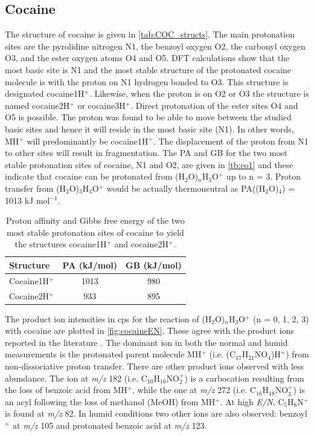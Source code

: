  
\subsection{Cocaine}
The structure of cocaine is given in \autoref{tab:COC_structs}. The main protonation sites are the pyrolidine nitrogen N1, the benzoyl oxygen O2, the carbonyl oxygen O3, and the ester oxygen atoms O4 and O5.
%
DFT calculations show that the most basic site is N1 and the most stable structure of the protonated cocaine molecule is with the proton on N1 hydrogen bonded to O3. This structure is designated cocaine1H$^+$.
%
Likewise, when the proton is on O2 or O3 the structure is named cocaine2H$^+$ or cocaine3H$^+$.
%
Direct protonation of the ester sites O4 and O5 is possible.
%
The proton was found to be able to move between the studied basic sites and hence it will reside in the most basic site (N1).
In other words, MH$^+$ will predominantly be cocaine1H$^+$.
%
The displacement of the proton  from N1 to other sites  will result in fragmentation.
%
The PA and GB for the two most stable protonation sites of cocaine, N1 and O2, are given in \autoref{tb:co1} and these indicate that cocaine can be protonated from (H$_2$O)$_n$H$_3$O$^+$ up to n = 3.
Proton transfer from (H$_2$O)$_3$H$_3$O$^+$ would be actually thermoneutral as PA((H$_2$O)$_4$) = 1013 kJ mol$^{-1}$. 

\begin{table}[htbp]
\centering
\caption{Proton affinity and Gibbs free energy of the two most stable protonation sites of cocaine to yield the structures cocaine1H$^+$ and cocaine2H$^+$.}
\label{tb:co1}
\begin{tabular}{lcc}
\toprule
\textbf{Structure} &\textbf{PA (kJ/mol)} &\textbf{GB (kJ/mol)}\\ \toprule
Cocaine1H$^+$  & 1013 &   980    \\
Cocaine2H$^+$  & 933 &   895    \\
\bottomrule
\end{tabular}
\end{table}




The product ion intensities in cps for the reaction of (H$_2$O)$_n$H$_3$O$^+$ (n = 0, 1, 2, 3)  with cocaine are plotted in \autoref{fig:cocaineEN}.
%
These agree with the product ions reported in the literature \cite{Agarwal2011,wang1998collision}.
%
The dominant ion in both the normal and humid measurements is the protonated parent molecule MH$^+$ (i.e. (C$_{17}$H$_{21}$NO$_4$)H$^+$) from non-dissociative proton transfer. 
%
There are other product ions observed with less abundance.
%
The ion at \textit{m/z} 182 (i.e. C$_{10}$H$_{16}$NO$_2^+$) is a carbocation resulting from the loss of benzoic acid from MH$^+$, while the one at \textit{m/z} 272 (i.e. C$_{16}$H$_{18}$NO$_3^+$) is an acyl following the loss of methanol (MeOH) from  MH$^+$.
%
At high \textit{E/N}, C$_{5}$H$_{8}$N$^+$ is found at \textit{m/z} 82.
%
In humid conditions two other ions are also observed: benzoyl$^+$ at \textit{m/z} 105 and protonated benzoic acid at \textit{m/z} 123.
%



